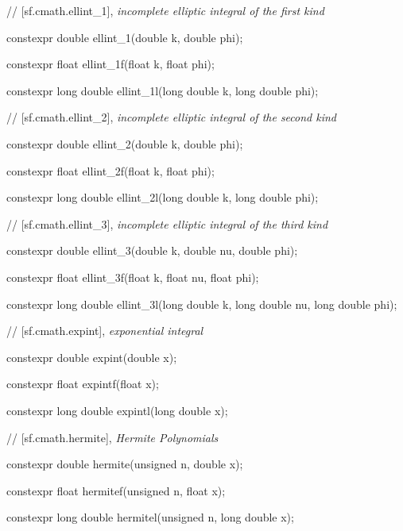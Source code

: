 \documentclass[prd,twocolumn,amsmath,amssymb,nofootinbib,eqsecnum]{revtex4-1}
\newcommand{\highlight}[1]{{\color{red} #1}}
\newcommand{\bigund}{{\Huge{\_}}}
\begin{document}
{\vspace{2ex}
// [sf.cmath.ellint{\bigund}1], {\it incomplete elliptic integral of the first kind}
\vspace{2ex}

\highlight{constexpr} double ellint\_1(double k, double phi);
	
\highlight{constexpr} float ellint\_1f(float k, float phi);
	
\highlight{constexpr} long double ellint\_1l(long double k, long double phi);

\vspace{2ex}
// [sf.cmath.ellint{\bigund}2], {\it incomplete elliptic integral of the second kind}
\vspace{2ex}

\highlight{constexpr} double ellint\_2(double k, double phi);
	
\highlight{constexpr} float ellint\_2f(float k, float phi);
	
\highlight{constexpr} long double ellint\_2l(long double k, long double phi);

\vspace{2ex}
// [sf.cmath.ellint{\bigund}3], {\it incomplete elliptic integral of the third kind}
\vspace{2ex}

\highlight{constexpr} double ellint\_3(double k, double nu, double phi);
	
\highlight{constexpr} float ellint\_3f(float k, float nu, float phi);
	
\highlight{constexpr} long double ellint\_3l(long double k, long double nu, long double phi);

\vspace{2ex}
// [sf.cmath.expint], {\it exponential integral}
\vspace{2ex}

\highlight{constexpr} double expint(double x);
	
\highlight{constexpr} float expintf(float x);
	
\highlight{constexpr} long double expintl(long double x);

\vspace{2ex}
// [sf.cmath.hermite], {\it Hermite Polynomials}
\vspace{2ex}

\highlight{constexpr} double hermite(unsigned n, double x);
	
\highlight{constexpr} float hermitef(unsigned n, float x);
	
\highlight{constexpr} long double hermitel(unsigned n, long double x);

}
\end{document}
